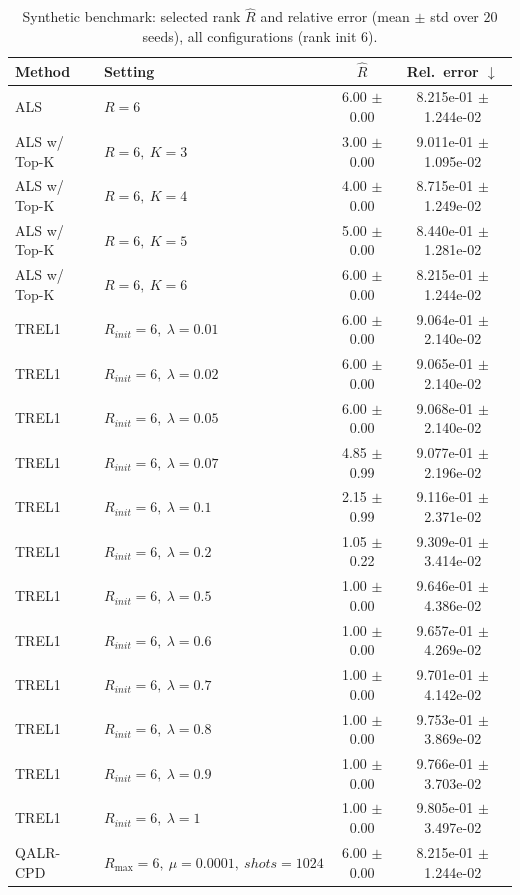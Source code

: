 \begin{table}[t]
\centering
\caption{Synthetic benchmark: selected rank \(\hat R\) and relative error (mean \(\pm\) std over \(20\) seeds), all configurations (rank init 6).}
\label{tab:results_synth_all}
\begin{tabular}{@{}llcc@{}}
\toprule
Method & Setting & \(\hat R\) & Rel.\ error \(\downarrow\) \\ \midrule
ALS & \(R=6\) & 6.00 $\pm$ 0.00 & 8.215e-01 $\pm$ 1.244e-02 \\
ALS w/ Top-K & \(R=6,\ K=3\) & 3.00 $\pm$ 0.00 & 9.011e-01 $\pm$ 1.095e-02 \\
ALS w/ Top-K & \(R=6,\ K=4\) & 4.00 $\pm$ 0.00 & 8.715e-01 $\pm$ 1.249e-02 \\
ALS w/ Top-K & \(R=6,\ K=5\) & 5.00 $\pm$ 0.00 & 8.440e-01 $\pm$ 1.281e-02 \\
ALS w/ Top-K & \(R=6,\ K=6\) & 6.00 $\pm$ 0.00 & 8.215e-01 $\pm$ 1.244e-02 \\
TREL1 & \(R_{init}=6,\ \lambda=0.01\) & 6.00 $\pm$ 0.00 & 9.064e-01 $\pm$ 2.140e-02 \\
TREL1 & \(R_{init}=6,\ \lambda=0.02\) & 6.00 $\pm$ 0.00 & 9.065e-01 $\pm$ 2.140e-02 \\
TREL1 & \(R_{init}=6,\ \lambda=0.05\) & 6.00 $\pm$ 0.00 & 9.068e-01 $\pm$ 2.140e-02 \\
TREL1 & \(R_{init}=6,\ \lambda=0.07\) & 4.85 $\pm$ 0.99 & 9.077e-01 $\pm$ 2.196e-02 \\
TREL1 & \(R_{init}=6,\ \lambda=0.1\) & 2.15 $\pm$ 0.99 & 9.116e-01 $\pm$ 2.371e-02 \\
TREL1 & \(R_{init}=6,\ \lambda=0.2\) & 1.05 $\pm$ 0.22 & 9.309e-01 $\pm$ 3.414e-02 \\
TREL1 & \(R_{init}=6,\ \lambda=0.5\) & 1.00 $\pm$ 0.00 & 9.646e-01 $\pm$ 4.386e-02 \\
TREL1 & \(R_{init}=6,\ \lambda=0.6\) & 1.00 $\pm$ 0.00 & 9.657e-01 $\pm$ 4.269e-02 \\
TREL1 & \(R_{init}=6,\ \lambda=0.7\) & 1.00 $\pm$ 0.00 & 9.701e-01 $\pm$ 4.142e-02 \\
TREL1 & \(R_{init}=6,\ \lambda=0.8\) & 1.00 $\pm$ 0.00 & 9.753e-01 $\pm$ 3.869e-02 \\
TREL1 & \(R_{init}=6,\ \lambda=0.9\) & 1.00 $\pm$ 0.00 & 9.766e-01 $\pm$ 3.703e-02 \\
TREL1 & \(R_{init}=6,\ \lambda=1\) & 1.00 $\pm$ 0.00 & 9.805e-01 $\pm$ 3.497e-02 \\
QALR-CPD & \(R_{\max}=6,\ \mu=0.0001,\ shots=1024\) & 6.00 $\pm$ 0.00 & 8.215e-01 $\pm$ 1.244e-02 \\

\end{tabular}
\end{table}

